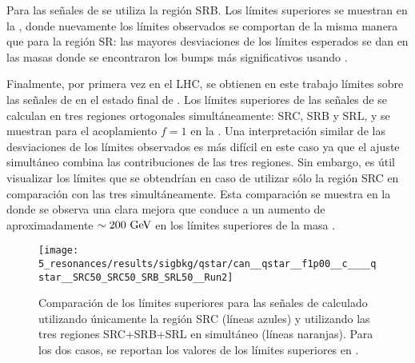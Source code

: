 Para las señales de \bstar se utiliza la región SRB. Los límites superiores se muestran en la \Fig{\ref{fig:results:results:bkgsig:results:qstar:limits:SRB}}, donde nuevamente los límites observados se comportan de la misma manera que para la región SR: las mayores desviaciones de los límites esperados se dan en las masas donde se encontraron los bumps más significativos usando \bh.

Finalmente, por primera vez en el \ac{LHC}, se obtienen en este trabajo límites sobre las señales de \cstar en el estado final de \gammajet. Los límites superiores de las señales de \cstar se calculan en tres regiones ortogonales simultáneamente: SRC, SRB y SRL, y se muestran para el acoplamiento \(f=1\) en la \Fig{\ref{fig:results:results:bkgsig:results:qstar:limits:SRC}}. Una interpretación similar de las desviaciones de los límites observados es más difícil en este caso ya que el ajuste simultáneo combina las contribuciones de las tres regiones. Sin embargo, es útil visualizar los límites que se obtendrían en caso de utilizar sólo la región SRC en comparación con las tres simultáneamente. Esta comparación se muestra en la \Fig{\ref{fig:results:results:bkgsig:results:qstar:limits_SRC_comparison}} donde se observa una clara mejora que conduce a un aumento de aproximadamente \(\sim 200~\text{GeV}\) en los límites superiores de la masa \mc.

\begin{figure}[ht!]
    \centering
    \texttt{[image: 5\_resonances/results/sigbkg/qstar/can\_\_qstar\_\_f1p00\_\_c\_\_\_\_qstar\_\_SRC50\_SRC50\_SRB\_SRL50\_\_Run2]}
    \caption{Comparación de los límites superiores para las señales de \cstar calculado utilizando únicamente la región SRC (líneas azules) y utilizando las tres regiones SRC+SRB+SRL en simultáneo (líneas naranjas). Para los dos casos, se reportan los valores de los límites superiores en \mq.}
    \label{fig:results:results:bkgsig:results:qstar:limits_SRC_comparison}
\end{figure}

